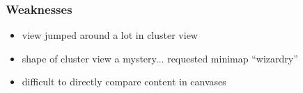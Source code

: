 \subsubsection{Weaknesses}

\begin{itemize}
	\item view jumped around a lot in cluster view
	\item shape of cluster view a mystery... requested minimap ``wizardry''
	\item difficult to directly compare content in canvases
\end{itemize}		




